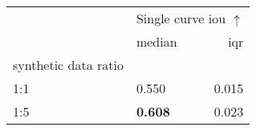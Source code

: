 \begin{tabular}{llr}
\toprule
 & \multicolumn{2}{c}{Single curve \acrshort{iou} $\uparrow$} \\
 & median & \acrshort{iqr} \\
synthetic data ratio &  &  \\
\midrule
1:1 & 0.550 & 0.015 \\
1:5 & \textbf{0.608} & 0.023 \\
\bottomrule
\end{tabular}
